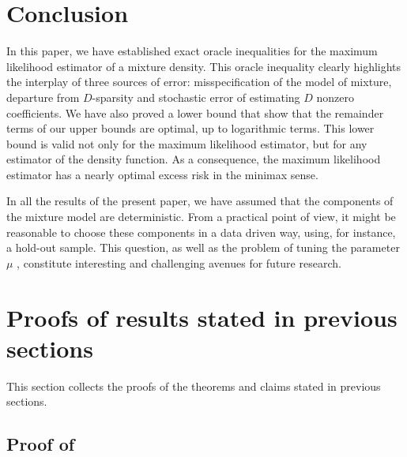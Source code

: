 \section{Conclusion} %
\label{sec:conclusion}

In this paper, we have established exact oracle inequalities for the maximum likelihood 
estimator of a mixture density. This oracle inequality clearly highlights the interplay
of three sources of error: misspecification of the model of mixture, departure from 
$D$-sparsity and stochastic error of estimating $D$ nonzero coefficients.  We have also
proved a lower bound that show that the remainder terms of our upper bounds are optimal, 
up to logarithmic terms. This lower bound is valid not only for the maximum likelihood
estimator, but for any estimator of the density function. As a consequence, the maximum
likelihood estimator has a nearly optimal excess risk in the minimax sense. 

In all the results of the present paper, we have assumed that the components of the mixture 
model are deterministic. From a practical point of view, it might be reasonable to choose
these components in a data driven way, using, for instance, a hold-out sample. This question,
as well as the problem of tuning the parameter $\mu$ , constitute interesting and challenging
avenues for  future research.




\section[Proofs: Upper bounds]{Proofs of results stated in previous sections} %
\label{sec:proofs}

This section collects the proofs of the theorems and claims stated in previous sections.

\subsection{Proof of }

